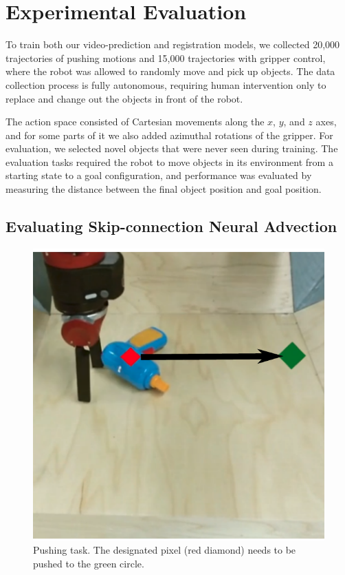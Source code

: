 \section{Experimental Evaluation}


To train both our video-prediction and registration models, we collected 20,000 trajectories of pushing motions and 15,000 trajectories with gripper control, where the robot was allowed to randomly move and pick up objects. The data collection process is fully autonomous, requiring human intervention only to replace and change out the objects in front of the robot.

The action space consisted of Cartesian movements along the $x$, $y$, and $z$ axes, and for some parts of it we also added azimuthal rotations of the gripper. For evaluation, we selected novel objects that were never seen during training. The evaluation tasks required the robot to move objects in its environment from a starting state to a goal configuration, and performance was evaluated by measuring the distance between the final object position and goal position. %

\subsection{Evaluating Skip-connection Neural Advection}
\label{subsec:sna_experiments}
\begin{figure}
	\centering
	\includegraphics[width=0.30\columnwidth]{images_sna/longdistance_pushing/pushing.pdf}
	\caption{
		Pushing task. The designated pixel (red diamond) needs to be pushed to the green circle.
		\label{fig:long_distance_task}
	}
\end{figure}

